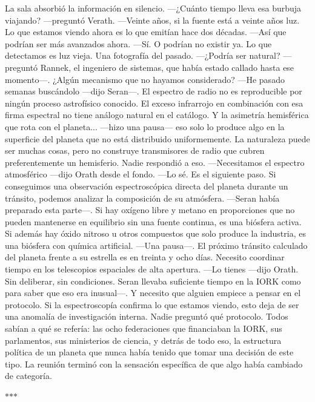 \documentclass[11pt,a5paper,twoside]{book}
\begin{document}
La sala absorbió la información en silencio.
—¿Cuánto tiempo lleva esa burbuja viajando? —preguntó Verath.
—Veinte años, si la fuente está a veinte años luz. Lo que estamos viendo ahora es lo que emitían hace dos décadas.
—Así que podrían ser más avanzados ahora.
—Sí. O podrían no existir ya. Lo que detectamos es luz vieja. Una fotografía del pasado.
—¿Podría ser natural? —preguntó Rannek, el ingeniero de sistemas, que había estado callado hasta ese momento—. ¿Algún mecanismo que no hayamos considerado?
—He pasado semanas buscándolo —dijo Seran—. El espectro de radio no es reproducible por ningún proceso astrofísico conocido. El exceso infrarrojo en combinación con esa firma espectral no tiene análogo natural en el catálogo. Y la asimetría hemisférica que rota con el planeta... —hizo una pausa— eso solo lo produce algo en la superficie del planeta que no está distribuido uniformemente. La naturaleza puede ser muchas cosas, pero no construye transmisores de radio que cubren preferentemente un hemisferio.
Nadie respondió a eso.
—Necesitamos el espectro atmosférico —dijo Orath desde el fondo.
—Lo sé. Es el siguiente paso. Si conseguimos una observación espectroscópica directa del planeta durante un tránsito, podemos analizar la composición de su atmósfera. —Seran había preparado esta parte—. Si hay oxígeno libre y metano en proporciones que no pueden mantenerse en equilibrio sin una fuente continua, es una biósfera activa. Si además hay óxido nitroso u otros compuestos que solo produce la industria, es una biósfera con química artificial. —Una pausa—. El próximo tránsito calculado del planeta frente a su estrella es en treinta y ocho días. Necesito coordinar tiempo en los telescopios espaciales de alta apertura.
—Lo tienes —dijo Orath. Sin deliberar, sin condiciones. Seran llevaba suficiente tiempo en la IORK como para saber que eso era inusual—. Y necesito que alguien empiece a pensar en el protocolo. Si la espectroscopía confirma lo que estamos viendo, esto deja de ser una anomalía de investigación interna.
Nadie preguntó qué protocolo. Todos sabían a qué se refería: las ocho federaciones que financiaban la IORK, sus parlamentos, sus ministerios de ciencia, y detrás de todo eso, la estructura política de un planeta que nunca había tenido que tomar una decisión de este tipo.
La reunión terminó con la sensación específica de que algo había cambiado de categoría.
\vspace{1.5em}
\begin{center}$\ast$\quad$\ast$\quad$\ast$\end{center}
\vspace{1.5em}
\end{document}
